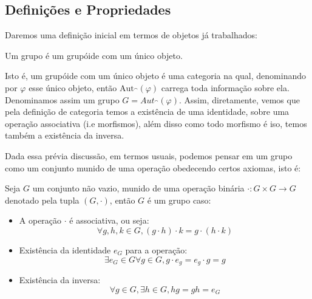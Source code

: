 \documentclass[../main]{subfiles}
\begin{document}
\newcommand{\stmat}[3]{\begin{pmatrix} 
    1 & 2 & 3 \\
    #1 & #2 & #3 \end{pmatrix}}
\subsection{Definições e Propriedades}
Daremos uma definição inicial em termos de objetos já trabalhados:
\begin{definition}
    Um grupo é um grupóide com um único objeto.
\end{definition}

Isto é, um grupóide com um único objeto é uma categoria na qual, denominando por
\(\varphi\) esse único objeto, então \(\text{Aut}_\cat(\varphi)\) carrega toda
informação sobre ela. Denominamos assim um grupo \(G = Aut_\cat(\varphi)\).
Assim, diretamente, vemos que pela definição de categoria temos a existência de
uma identidade, sobre uma operação associativa (i.e morfismos), além disso como
todo morfismo é iso, temos também a existência da inversa.

Dada essa prévia discussão, em termos usuais, podemos pensar em um grupo como um
conjunto munido de uma operação obedecendo certos axiomas, isto é:
\begin{definition}[Grupo]
    Seja \(G\) um conjunto não vazio, munido de uma operação binária \(\cdot: G
    \times G \to G\) denotado pela tupla \((G, \cdot)\), então \(G\) é um grupo
    caso:
    \begin{itemize}
        \item A operação \(\cdot\) é associativa, ou seja:
        \[
            \forall g, h, k \in G, (g \cdot h) \cdot k = g \cdot (h \cdot k)
        \]
        \item Existência da identidade \(e_G\) para a operação:
        \[\exists e_G \in G \forall g \in G, g \cdot e_g = e_g \cdot g = g\]
        \item Existência da inversa:
        \[\forall g \in G, \exists h \in G, hg = gh = e_G\]
    \end{itemize}
\end{definition} 
\end{document}

